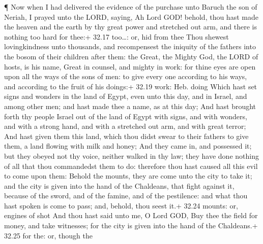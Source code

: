  ¶ Now when I had delivered the evidence of the purchase
unto Baruch the son of Neriah, I prayed unto the LORD, saying,
 Ah Lord GOD! behold, thou hast made the heaven and the
earth by thy great power and stretched out arm, and there is nothing too
hard for thee:+ 32.17 too\ldots: or, hid from thee  Thou
shewest lovingkindness unto thousands, and recompensest the iniquity of
the fathers into the bosom of their children after them: the Great, the
Mighty God, the LORD of hosts, is his name,  Great in
counsel, and mighty in work: for thine eyes are open upon all the ways
of the sons of men: to give every one according to his ways, and
according to the fruit of his doings:+ 32.19 work: Heb. doing
 Which hast set signs and wonders in the land of Egypt,
even unto this day, and in Israel, and among other men; and hast made
thee a name, as at this day;  And hast brought forth thy
people Israel out of the land of Egypt with signs, and with wonders, and
with a strong hand, and with a stretched out arm, and with great terror;
 And hast given them this land, which thou didst swear to
their fathers to give them, a land flowing with milk and honey;
 And they came in, and possessed it; but they obeyed not
thy voice, neither walked in thy law; they have done nothing of all that
thou commandedst them to do: therefore thou hast caused all this evil to
come upon them:  Behold the mounts, they are come unto the
city to take it; and the city is given into the hand of the Chaldeans,
that fight against it, because of the sword, and of the famine, and of
the pestilence: and what thou hast spoken is come to pass; and, behold,
thou seest it.+ 32.24 mounts: or, engines of shot  And thou
hast said unto me, O Lord GOD, Buy thee the field for money, and take
witnesses; for the city is given into the hand of the Chaldeans.+ 32.25
for the: or, though the

